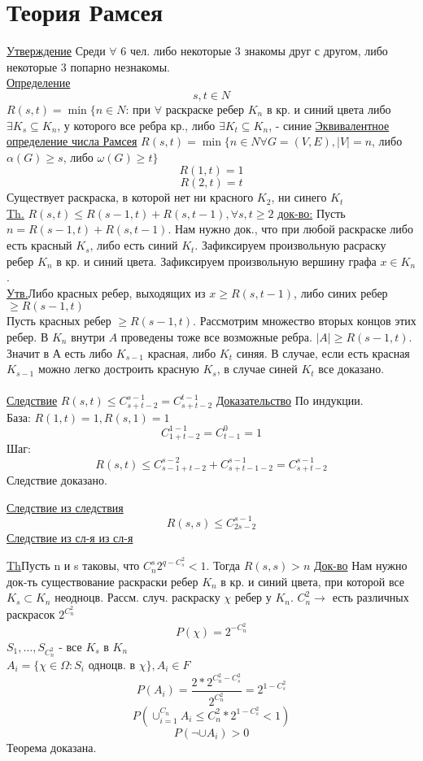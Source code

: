 \documentclass{article}
\begin{document}
 

\section{Теория Рамсея}

\underline{Утверждение}
Среди $\forall$ 6 чел. либо некоторые 3 знакомы друг с другом, либо некоторые 3 попарно незнакомы.\\
\underline{Определение}$$s,t \in N$$
$ R(s,t)=\min\{n \in N $: при $ \forall $ раскраске ребер $K_n$ в кр. и синий цвета либо $\exists K_s \subseteq K_n $, 
у  которого все ребра кр., либо $\exists K_t \subseteq K_n $, - синие %
\underline{Эквивалентное определение числа Рамсея}
$R(s,t) = \min\{n \in N \forall G=(V,E), |V|=n$, либо $\alpha(G) \ge s$, либо $\omega(G) \ge t\}$\\
$$R(1,t) = 1$$
$$R(2,t) = t$$
Существует раскраска, в которой нет ни красного $K_2$, ни синего $K_t$\\

\underline{Th.} $R(s,t) \le R(s-1,t) + R(s,t-1), \forall s,t \ge 2$
\underline{док-во:}
Пусть $n=R(s-1,t) + R(s,t-1)$. Нам нужно док., что при любой раскраске либо есть красный $K_s$, либо есть синий $K_t$.
Зафиксируем произвольную расраску ребер $K_n$ в кр. и синий цвета.
Зафиксируем произвольную вершину графа $x \in K_n$.\\
\underline{Утв.}Либо красных ребер, выходящих из $x \ge R(s,t-1)$, либо синих ребер $\ge R(s-1,t)$\\
Пусть красных ребер $\ge R(s-1,t)$. Рассмотрим множество вторых концов этих ребер.
В $K_n$ внутри $A$ проведены тоже все возможные ребра. $|A| \ge R(s-1,t)$. 
Значит в А есть либо $K_{s-1}$ красная, либо $K_t$ синяя. 
В случае, если есть красная $K_{s-1}$ можно легко достроить красную $K_s$, в случае синей $K_t$ все доказано.\\
\\

\underline{Следствие}
$R(s,t) \le C_{s+t-2}^{s-1}=C_{s+t-2}^{t-1}$
\underline{Доказательство}
По индукции.\\
База:
$R(1,t)=1, R(s,1) = 1$
$$C_{1+t-2}^{1-1}=C_{t-1}^0=1$$
Шаг:$$R(s,t) \le C_{s-1+t-2}^{s-2} + C_{s+t-1-2}^{s-1}=C_{s+t-2}^{s-1}$$
Следствие доказано.

\underline{Следствие из следствия}
$$R(s,s) \le C_{2s-2}^{s-1}$$
\underline{Следствие из сл-я из сл-я}

\underline{Th}Пусть n  и s таковы, что $C_n^s2^{q-C_s^2}<1$. Тогда $R(s,s) > n$
\underline{Док-во}
Нам нужно док-ть существование раскраски ребер $K_n$ в кр. и синий  цвета, при которой все $K_s \subset K_n$ неодноцв.
Рассм. случ. раскраску $\chi$ ребер у $K_n$. $C_n^2 \to $ есть различных раскрасок $2^{C_n^2}$
$$P(\chi)=2^{-C_n^2}$$
$S_1,\ldots,S_{C_n^2}$ - все $K_s$ в $K_n$\\
$A_i = \{\chi \in \Omega: S_i$ одноцв. в $\chi\}, A_i \in F$
$$P(A_i)=\frac{2*2^{C_n^2-C_s^2}}{2^{C_n^2}}=2^{1-C_s^2}$$
$$P(\cup^{C_n}_{i=1}A_i \le C_n^2*2^{1-C_s^2} < 1)$$
$$P(\neg \cup A_i) > 0$$
Теорема доказана.\\
\\
\end{document}
